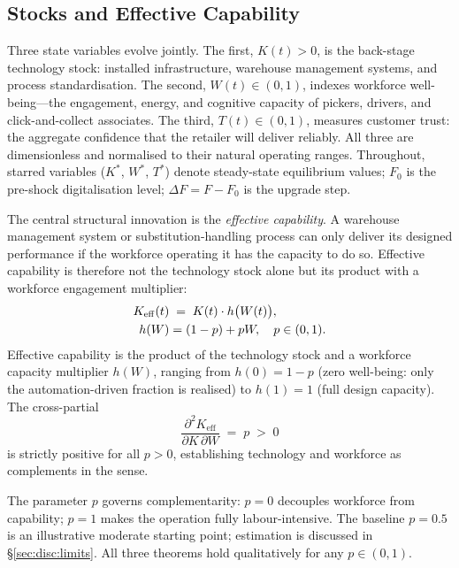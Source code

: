 \documentclass[msom,dblanonrev]{informs4}
\newcommand{\Keff}{K_{\mathrm{eff}}}
\begin{document}
\subsection{Stocks and Effective Capability}\label{sec:model:stocks}

Three state variables evolve jointly. The first, $K(t) > 0$, is the back-stage technology stock: installed infrastructure, warehouse management systems, and process standardisation. The second, $W(t) \in (0,1)$, indexes workforce well-being---the engagement, energy, and cognitive capacity of pickers, drivers, and click-and-collect associates. The third, $T(t) \in (0,1)$, measures customer trust: the aggregate confidence that the retailer will deliver reliably. All three are dimensionless and normalised to their natural operating ranges. Throughout, starred variables ($K^*$, $W^*$, $T^*$) denote steady-state equilibrium values; $F_0$ is the pre-shock digitalisation level; $\Delta F = F - F_0$ is the upgrade step.

The central structural innovation is the \emph{effective capability}. A warehouse management system or substitution-handling process can only deliver its designed performance if the workforce operating it has the capacity to do so. Effective capability is therefore not the technology stock alone but its product with a workforce engagement multiplier:
\begin{align}\label{eq:Keff}
    \Keff(t) &\;=\; K(t) \cdot h\bigl(W(t)\bigr), \notag\\
    h(W) &= (1-p) + pW, \quad p \in (0,1).
\end{align}
Effective capability is the product of the technology stock and a workforce capacity multiplier $h(W)$, ranging from $h(0) = 1-p$ (zero well-being: only the automation-driven fraction is realised) to $h(1) = 1$ (full design capacity). The cross-partial
\begin{equation}\label{eq:cross_partial}
    \frac{\partial^2 \Keff}{\partial K\, \partial W} \;=\; p \;>\; 0
\end{equation}
is strictly positive for all $p > 0$, establishing technology and workforce as complements in the \citet{milgrom1990economics} sense.

The parameter $p$ governs complementarity: $p = 0$ decouples workforce from capability; $p = 1$ makes the operation fully labour-intensive. The baseline $p = 0.5$ is an illustrative moderate starting point; estimation is discussed in \S\ref{sec:disc:limits}. All three theorems hold qualitatively for any $p \in (0,1)$.
\end{document}
